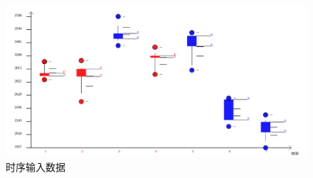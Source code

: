 \begin{figure}[h!]
	\centering
	\includegraphics[scale=0.25]{./images/figure-4-1}
	\caption{时序输入数据}
	\label{Figure 4-1-1}
\end{figure}
























